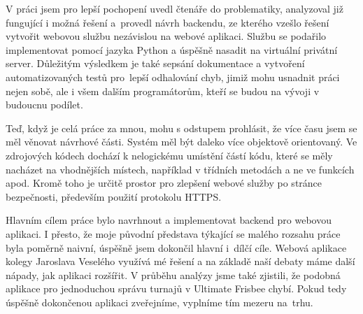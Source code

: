 \begin{conclusion}


  V práci jsem pro lepší pochopení uvedl čtenáře do problematiky, analyzoval již fungující i možná řešení
  a~provedl návrh backendu, ze kterého vzešlo řešení vytvořit webovou službu nezávislou na webové aplikaci.
  Službu se podařilo implementovat pomocí jazyka Python a úspěšně nasadit na virtuální privátní server.
  Důležitým výsledkem je také sepsání dokumentace a vytvoření automatizovaných testů pro~lepší odhalování chyb,
  jimiž mohu usnadnit práci nejen sobě, ale i všem dalším programátorům, kteří se budou na vývoji v budoucnu podílet. %
  
  Teď, když je celá práce za mnou, mohu s odstupem prohlásit, že více času jsem se měl věnovat návrhové části.
  Systém měl být daleko více objektově orientovaný. Ve zdrojových kódech dochází k nelogickému umístění částí kódu,
  které se měly nacházet na vhodnějších místech, například v třídních metodách a ne ve funkcích apod.
  Kromě toho je určitě prostor pro zlepšení webové služby po stránce bezpečnosti, především použití protokolu HTTPS.
  
  Hlavním cílem práce bylo navrhnout a implementovat backend pro webovou aplikaci. I přesto, že moje původní představa
  týkající se malého rozsahu práce byla poměrně naivní, úspěšně jsem dokončil hlavní i~dílčí cíle. Webová aplikace kolegy Jaroslava Veselého
  využívá mé řešení a na základě naší debaty máme další nápady, jak aplikaci rozšířit. V průběhu analýzy jsme také zjistili,
  že podobná aplikace pro jednoduchou správu turnajů v Ultimate Frisbee chybí. Pokud tedy úspěšně dokončenou aplikaci zveřejníme,
  vyplníme tím mezeru na~trhu.  
\end{conclusion}